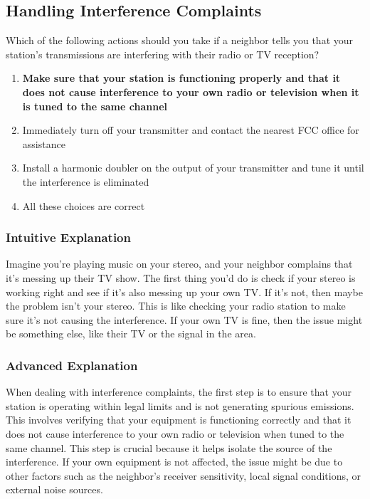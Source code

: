 \subsection{Handling Interference Complaints}
\label{T7B06}

\begin{tcolorbox}[colback=gray!10!white,colframe=black!75!black,title=T7B06]
Which of the following actions should you take if a neighbor tells you that your station’s transmissions are interfering with their radio or TV reception?
\begin{enumerate}[label=\Alph*)]
    \item \textbf{Make sure that your station is functioning properly and that it does not cause interference to your own radio or television when it is tuned to the same channel}
    \item Immediately turn off your transmitter and contact the nearest FCC office for assistance
    \item Install a harmonic doubler on the output of your transmitter and tune it until the interference is eliminated
    \item All these choices are correct
\end{enumerate}
\end{tcolorbox}

\subsubsection*{Intuitive Explanation}
Imagine you’re playing music on your stereo, and your neighbor complains that it’s messing up their TV show. The first thing you’d do is check if your stereo is working right and see if it’s also messing up your own TV. If it’s not, then maybe the problem isn’t your stereo. This is like checking your radio station to make sure it’s not causing the interference. If your own TV is fine, then the issue might be something else, like their TV or the signal in the area.

\subsubsection*{Advanced Explanation}
When dealing with interference complaints, the first step is to ensure that your station is operating within legal limits and is not generating spurious emissions. This involves verifying that your equipment is functioning correctly and that it does not cause interference to your own radio or television when tuned to the same channel. This step is crucial because it helps isolate the source of the interference. If your own equipment is not affected, the issue might be due to other factors such as the neighbor’s receiver sensitivity, local signal conditions, or external noise sources. 

